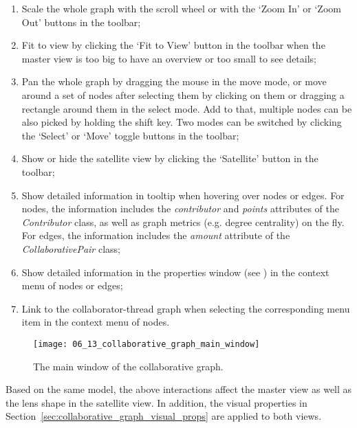 \begin{enumerate}
	\item Scale the whole graph with the scroll wheel or with the `Zoom In' or `Zoom Out' buttons in the toolbar; \\
	\item Fit to view by clicking the `Fit to View' button in the toolbar when the master view is too big to have an overview or too small to see details; \\
	\item Pan the whole graph by dragging the mouse in the move mode, or move around a set of nodes after selecting them by clicking on them or dragging a rectangle around them in the select mode. Add to that, multiple nodes can be also picked by holding the shift key. Two modes can be switched by clicking the `Select' or `Move' toggle buttons in the toolbar; \\
	\item Show or hide the satellite view by clicking the `Satellite' button in the toolbar; \\
	\item Show detailed information in tooltip when hovering over nodes or edges. For nodes, the information includes the \emph{contributor} and \emph{points} attributes of the \emph{Contributor} class, as well as graph metrics (e.g. degree centrality) on the fly. For edges, the information includes the \emph{amount} attribute of the \emph{CollaborativePair} class; \\
  \item Show detailed information in the properties window (see ) in the context menu of nodes or edges; \\
	\item Link to the collaborator-thread graph when selecting the corresponding menu item in the context menu of nodes.
\end{enumerate}

\begin{figure}[!htb]
  \centering
  \texttt{[image: 06\_13\_collaborative\_graph\_main\_window]}
  \caption{The main window of the collaborative graph.}
  \label{Figure:06_13}
\end{figure}

Based on the same model, the above interactions affect the master view as well as the lens shape in the satellite view. In addition, the visual properties in Section~\ref{sec:collaborative_graph_visual_props} are applied to both views.

